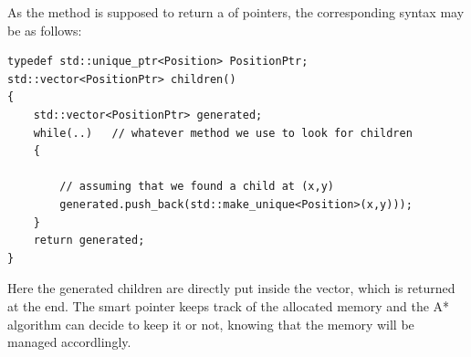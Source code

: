 \documentclass{ecnreport}
\begin{document}
As the  method is supposed to return a  of pointers, the corresponding syntax may be as follows:
\begin{center}\cppstyle
\begin{lstlisting}
typedef std::unique_ptr<Position> PositionPtr;
std::vector<PositionPtr> children()
{
    std::vector<PositionPtr> generated;
    while(..)   // whatever method we use to look for children
    {
    
        // assuming that we found a child at (x,y)
        generated.push_back(std::make_unique<Position>(x,y)));
    }
    return generated;
}
\end{lstlisting}
\end{center}
Here the generated children are directly put inside the vector, which is returned at the end. The smart pointer keeps track 
of the allocated memory and the A* algorithm can decide to keep it or not, knowing that the memory will be managed accordlingly.
\end{document}

